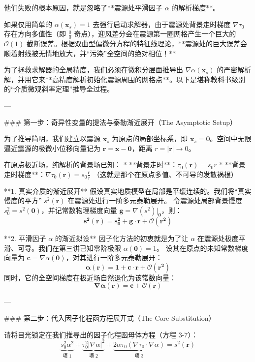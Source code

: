\documentclass[12pt]{article}
\begin{document}
{他们失败的根本原因，就是忽略了**震源处平滑因子 $\alpha$ 的解析梯度**。

如果仅用简单的 $\alpha(\mathbf{x}_s) = 1$ 去强行启动求解器，由于震源处背景走时梯度 $\nabla \tau_0$ 存在方向多值性（即 $\frac{0}{0}$ 奇点），迎风差分会在震源第一圈网格产生一个巨大的 $\mathcal{O}(1)$ 截断误差。根据双曲型偏微分方程的特征线理论，**震源处的巨大误差会顺着射线被无情地放大，并“污染”全空间的绝对相位！**

为了拯救求解器的全局精度，我们必须在微积分层面推导出 $\nabla \alpha(\mathbf{x}_s)$ 的严密解析解，并用它来**高精度解析初始化震源周围的网格点**。以下是堪称教科书级别的“介质微观斜率定理”推导全过程。

---

### 第一步：奇异性变量的提法与泰勒渐近展开（The Asymptotic Setup）

为了推导简明，我们建立以震源 $\mathbf{x}_s$ 为原点的局部坐标系，即 $\mathbf{x}_s = \mathbf{0}$。空间中无限逼近震源的极微小位移向量记为 $\mathbf{r} = \mathbf{x} - \mathbf{0}$，距离 $r = |\mathbf{r}| \to 0$。

在原点极近场，纯解析的背景场已知：
*   **背景走时**：$\tau_0(\mathbf{r}) = s_0 r$
*   **背景走时梯度**：$\nabla \tau_0(\mathbf{r}) = s_0 \frac{\mathbf{r}}{r}$ （这就是那个在原点多值、不可导的发散祸根）

**1. 真实介质的渐近展开**
假设真实地质模型在局部是平缓连续的。我们将“真实慢度的平方” $s^2(\mathbf{r})$ 在震源处进行一阶多元泰勒展开。
令震源处局部背景慢度 $s_0^2 = s^2(\mathbf{0})$，并记常数物理梯度向量 $\mathbf{g} = \nabla(s^2)|_{\mathbf{0}}$，则：
$$ \mathbf{s^2(\mathbf{r}) = s_0^2 + \mathbf{g} \cdot \mathbf{r} + \mathcal{O}(r^2)} $$

**2. 平滑因子 $\alpha$ 的渐近拟设**
因子化方法的初衷就是为了让 $\alpha$ 在震源处极度平滑、可导。我们在第三讲已知零阶极限 $\alpha(\mathbf{0}) = 1$。
设其在原点的未知常数梯度向量为 $\mathbf{c} = \nabla \alpha(\mathbf{0})$，对其进行一阶多元泰勒展开：
$$ \mathbf{\alpha(\mathbf{r}) = 1 + \mathbf{c} \cdot \mathbf{r} + \mathcal{O}(r^2)} $$
同时，它的全空间梯度在极近场自然退化为该常数向量：
$$ \mathbf{\nabla \alpha(\mathbf{r}) = \mathbf{c} + \mathcal{O}(r)} $$

---

### 第二步：代入因子化程函方程展开式（The Core Substitution）

请将目光锁定在我们推导出的因子化程函母体方程（方程 3-7）：
$$ \underbrace{s_0^2 \alpha^2}_{\text{项 1}} + \underbrace{\tau_0^2 |\nabla \alpha|^2}_{\text{项 2}} + \underbrace{2 \alpha \tau_0 (\nabla \tau_0 \cdot \nabla \alpha)}_{\text{项 3}} = s^2(\mathbf{r}) $$

}
\end{document}
